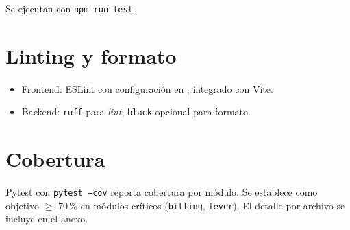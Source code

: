 Se ejecutan con \texttt{npm run test}.

\section{Linting y formato}

\begin{itemize}[leftmargin=*,itemsep=0.2em]
  \item Frontend: ESLint con configuración en
        , integrado con Vite.
  \item Backend: \texttt{ruff} para \emph{lint}, \texttt{black}
        opcional para formato.
\end{itemize}

\section{Cobertura}

Pytest con \texttt{pytest --cov} reporta cobertura por módulo.
Se establece como objetivo $\geq$ 70\,\% en módulos críticos
(\texttt{billing}, \texttt{fever}). El detalle por archivo se
incluye en el anexo.
